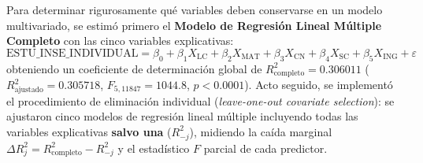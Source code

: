 \documentclass[11pt,letterpaper]{article}
\begin{document}
Para determinar rigurosamente qué variables deben conservarse en un modelo multivariado, se estimó primero el \textbf{Modelo de Regresión Lineal Múltiple Completo} con las cinco variables explicativas:
\begin{equation}
\text{ESTU\_INSE\_INDIVIDUAL} = \beta_0 + \beta_1 X_{\text{LC}} + \beta_2 X_{\text{MAT}} + \beta_3 X_{\text{CN}} + \beta_4 X_{\text{SC}} + \beta_5 X_{\text{ING}} + \varepsilon
\end{equation}
obteniendo un coeficiente de determinación global de \textbf{$R^2_{\text{completo}} = 0.306011$} ($R^2_{\text{ajustado}} = 0.305718$, $F_{5, 11847} = 1044.8$, $p < 0.0001$). Acto seguido, se implementó el procedimiento de eliminación individual (\textit{leave-one-out covariate selection}): se ajustaron cinco modelos de regresión lineal múltiple incluyendo todas las variables explicativas \textbf{salvo una} ($R^2_{-j}$), midiendo la caída marginal $\Delta R^2_j = R^2_{\text{completo}} - R^2_{-j}$ y el estadístico $F$ parcial de cada predictor.

\begin{table}[H]
\centering
\caption{Selección de variables explicativas mediante el coeficiente de determinación ($R^2$) dejando fuera una variable a la vez ($\text{Modelo Completo: } R^2 = 0.306011, \; R^2_{\text{ajustado}} = 0.305718$).}
\label{tab:r2_salvo_una}
\small
{}
\end{table}
\end{document}
